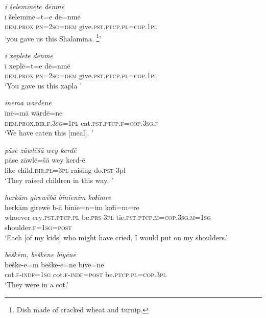 \ea \label{ŽE.51}
\textit{ī šelemīnēte dēnmē} \\ 
\gll ī šelemīnē=t=e dē=nmē \\ 
 \textsc{dem.prox} \textsc{pn}\textsc{=\textsc{2sg}}\textsc{=dem} give\textsc{.pst}\textsc{.ptcp}\textsc{.pl}\textsc{=cop}\textsc{.1pl} \\ 
\glt `you gave us this Shalamina. \footnote{Dish made of cracked wheat and turnip.}'
\z 
 
\ea \label{ŽE.52}
\textit{ī xeplēte dēnmē} \\ 
\gll ī xeplē=t=e dē=nmē \\ 
 \textsc{dem.prox} \textsc{pn}\textsc{=\textsc{2sg}}\textsc{=dem} give\textsc{.pst}\textsc{.ptcp}\textsc{.pl}\textsc{=cop}\textsc{.1pl} \\ 
\glt `You gave us this xapla '
\z 
 
\ea \label{ŽE.53}
\textit{īnēmā wārdēne} \\ 
\gll īnē=mā wārdē=ne \\ 
 \textsc{dem.prox}\textsc{.dir}\textsc{.f}\textsc{.3sg}\textsc{=1pl} eat\textsc{.pst}\textsc{.ptcp}\textsc{.f}\textsc{=cop}\textsc{.3sg}\textsc{.f} \\ 
\glt `We have eaten this [meal]. '
\z 
 
\ea \label{ŽE.55}
\textit{pāse zāwlēšā wey kerdē} \\ 
\gll pāse zāwlē=šā wey kerd-ē \\ 
 like child\textsc{.dir}\textsc{.pl}\textsc{=3pl} raising do\textsc{.pst} 3pl \\ 
\glt `They raised children in this way. '
\z 
 
\ea \label{ŽE.64}
\textit{herkām girewēbā bīnīenim koɫīmre} \\ 
\gll herkām girewē b-ā bīnīe=n=im koɫī=m=re \\ 
 whoever cry\textsc{.pst}\textsc{.ptcp}\textsc{.pl} be\textsc{.prs}\textsc{-3pl} tie\textsc{.pst}\textsc{.ptcp}\textsc{.m}\textsc{=cop}\textsc{.3sg}\textsc{.m}\textsc{=\textsc{1sg}} shoulder\textsc{.f}\textsc{=\textsc{1sg}}\textsc{=\textsc{post}} \\ 
\glt `Each [of my kids] who might have cried, I would put on my shoulders.'
\z 
 
\ea \label{ŽE.65}
\textit{bēškēm, bēškēne bīyēnē} \\ 
\gll bēške-ē=m bēške-ē=ne bīyē=nē \\ 
 cot\textsc{.f}\textsc{-indf}\textsc{=\textsc{1sg}} cot\textsc{.f}\textsc{-indf}\textsc{=\textsc{post}} be\textsc{.ptcp}\textsc{.pl}\textsc{=cop}\textsc{.3pl} \\ 
\glt `They were in a cot.'
\z 
 
